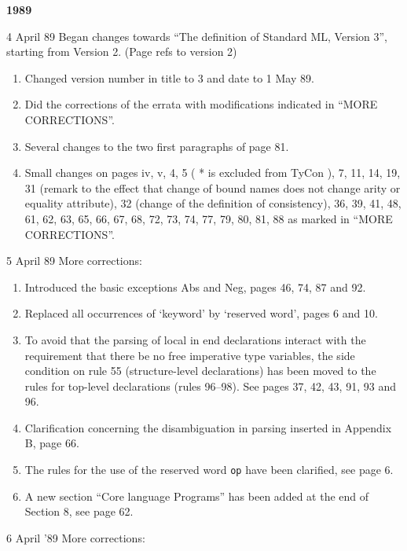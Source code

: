 \newpage
\begin{center} \bf 1989 \end{center}
\vspace{1cm}
\begin{description}
\item{4 April 89} Began changes towards ``The definition of Standard ML, Version 3'',
starting from Version 2. (Page refs to version 2)
\begin{enumerate}
\item Changed version number in title to 3 and date to 1 May 89.
\item Did the corrections of the errata with modifications indicated in 
``MORE CORRECTIONS''.
\item Several changes to the two first paragraphs of page 81.
\item Small changes on pages iv, v, 4, 5 ( * is excluded from TyCon ), 7,
11, 14, 19, 31 (remark to the effect that change of bound names does
not change arity or equality attribute), 32 (change of the definition
of consistency), 36, 39, 41, 48, 61, 62, 63, 65, 66, 67, 68, 72, 73, 74, 77,
79, 80, 81, 88 as marked in ``MORE CORRECTIONS''.
\end{enumerate}
\item{5 April 89} More corrections:
\begin{enumerate}
\item Introduced the basic exceptions Abs and Neg, pages 46, 74, 87 and 92.
\item Replaced all occurrences of `keyword' by `reserved word', pages 6 and 10.
\item To avoid that the parsing of \quad   local in end \quad declarations
      interact with the requirement that there be no free imperative type
      variables, the side condition on rule 55 (structure-level declarations)
      has been moved to the rules for top-level declarations (rules 96--98).
      See pages 37, 42, 43, 91, 93 and 96.
\item Clarification concerning the disambiguation in parsing inserted
      in Appendix B, page 66.
\item The rules for the use of the reserved word {\tt op} have
      been clarified, see page 6.
\item A new section ``Core language Programs'' has been added at the
      end of Section 8, see page 62.
\end{enumerate}
\item{6 April '89} More corrections:
\begin{enumerate}

\end{enumerate}
\end{description}
